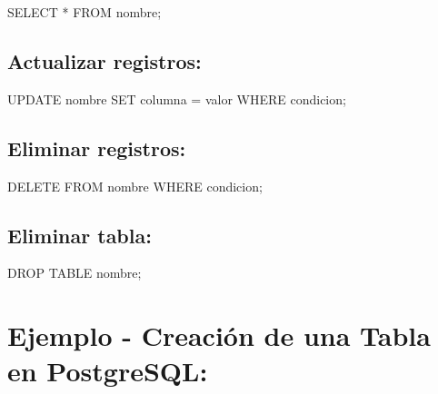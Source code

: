 \documentclass[
  a4paper,
  onepage,
  openany]{scrreprt}
\newenvironment{Shaded}{\begin{snugshade}}{\end{snugshade}}
\newcommand{\KeywordTok}[1]{\textcolor[rgb]{0.00,0.23,0.31}{#1}}
\newcommand{\NormalTok}[1]{\textcolor[rgb]{0.00,0.23,0.31}{#1}}
\newcommand{\OperatorTok}[1]{\textcolor[rgb]{0.37,0.37,0.37}{#1}}
\begin{document}
\begin{Shaded}
\begin{Highlighting}[]
\KeywordTok{SELECT} \OperatorTok{*} \KeywordTok{FROM}\NormalTok{ nombre;}
\end{Highlighting}
\end{Shaded}

\hypertarget{actualizar-registros-5}{%
\subsection{Actualizar registros:}\label{actualizar-registros-5}}

\begin{Shaded}
\begin{Highlighting}[]
\KeywordTok{UPDATE}\NormalTok{ nombre }\KeywordTok{SET}\NormalTok{ columna }\OperatorTok{=}\NormalTok{ valor }\KeywordTok{WHERE}\NormalTok{ condicion;}
\end{Highlighting}
\end{Shaded}

\hypertarget{eliminar-registros-5}{%
\subsection{Eliminar registros:}\label{eliminar-registros-5}}

\begin{Shaded}
\begin{Highlighting}[]
\KeywordTok{DELETE} \KeywordTok{FROM}\NormalTok{ nombre }\KeywordTok{WHERE}\NormalTok{ condicion;}
\end{Highlighting}
\end{Shaded}

\hypertarget{eliminar-tabla-3}{%
\subsection{Eliminar tabla:}\label{eliminar-tabla-3}}

\begin{Shaded}
\begin{Highlighting}[]
\KeywordTok{DROP} \KeywordTok{TABLE}\NormalTok{ nombre;}
\end{Highlighting}
\end{Shaded}

\hypertarget{ejemplo---creaciuxf3n-de-una-tabla-en-postgresql-3}{%
\section{Ejemplo - Creación de una Tabla en
PostgreSQL:}\label{ejemplo---creaciuxf3n-de-una-tabla-en-postgresql-3}}
\end{document}
